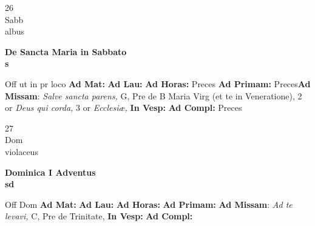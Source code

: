 \documentclass[10pt, openany]{book}
\begin{document}
    \begin{center}
        \begin{minipage}{3.5in}
            \vspace{2em}
            \begin{minipage}{0.5in}
                {\Huge 26} \\
                {\normalsize Sabb} \\
                {\normalsize albus}
            \end{minipage}
            \begin{minipage}{3.0in}
                \textbf{ \large De Sancta Maria in Sabbato \\
                \textnormal{\normalsize s}} \\ 
            \end{minipage}
            \begin{justify}Off ut in pr loco
                \textbf{Ad Mat: }
                \textbf{Ad Lau: }
                \textbf{Ad Horas: }Preces
                \textbf{Ad Primam: }Preces\textbf{Ad Missam}: \textit{Salve sancta parens,} G, Pre de B Maria Virg (et te in Veneratione), 2 or \textit{Deus qui corda,} 3 or \textit{Ecclesiæ,}  
                \textbf{In Vesp: }
                \textbf{Ad Compl: }Preces
            \end{justify}
        \end{minipage}
    \end{center}

    \begin{center}
        \begin{minipage}{3.5in}
            \vspace{2em}
            \begin{minipage}{0.5in}
                {\Huge 27} \\
                {\normalsize Dom} \\
                {\normalsize violaceus}
            \end{minipage}
            \begin{minipage}{3.0in}
                \textbf{ \large Dominica I Adventus \\
                \textnormal{\normalsize sd}} \\ 
            \end{minipage}
            \begin{justify}Off Dom
                \textbf{Ad Mat: }
                \textbf{Ad Lau: }
                \textbf{Ad Horas: }
                \textbf{Ad Primam: }\textbf{Ad Missam}: \textit{Ad te levavi,} C, Pre de Trinitate,  
                \textbf{In Vesp: }
                \textbf{Ad Compl: }
            \end{justify}
        \end{minipage}
    \end{center}
\end{document}
